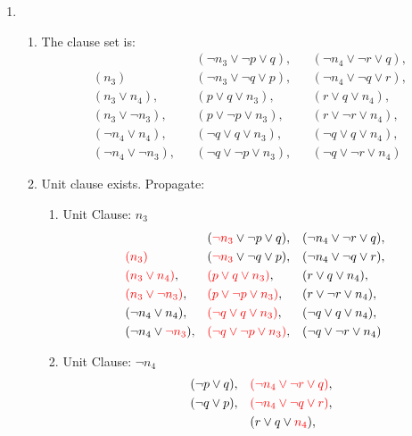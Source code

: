 \documentclass[11pt,a4paper]{article}
\begin{document}
\begin{enumerate}
\item 
\begin{enumerate}
\item The clause set is:
\begin{align*}
& & & (\neg n_3 \lor \neg p \lor q), & & (\neg n_4 \lor \neg r \lor q),\\ 
& (n_3) & & (\neg n_3 \lor \neg q \lor p),  && (\neg n_4 \lor \neg q \lor r), \\
&(n_3 \lor n_4),& & (p\lor q \lor n_3),  && (r \lor q \lor n_4), \\
&(n_3 \lor \neg  n_3 ) ,  & & (p \lor \neg p \lor n_3), & & (r \lor \neg r \lor n_4), \\
&(\neg n_4 \lor  n_4 ) , & & (\neg q \lor q \lor n_3),& & (\neg q \lor q \lor n_4), \\
&(\neg n_4 \lor  \neg  n_3), && (\neg q \lor \neg p \lor n_3), & & (\neg q \lor \neg r \lor n_4)
\end{align*}
\item Unit clause exists. Propagate:
\begin{enumerate}
\item Unit Clause:  $n_3$
\begin{align*}
& & & (\textcolor{red}{\neg n_3} \lor \neg p \lor q), & & (\neg n_4 \lor \neg r \lor q),\\ 
& \textcolor{red}{(n_3)} & & (\textcolor{red}{\neg n_3} \lor \neg q \lor p),  && (\neg n_4 \lor \neg q \lor r), \\
&\textcolor{red}{(n_3 \lor n_4)},& & \textcolor{red}{(p\lor q \lor n_3)},  && (r \lor q \lor n_4), \\
&\textcolor{red}{(n_3 \lor \neg  n_3 )} ,  & & \textcolor{red}{(p \lor \neg p \lor n_3)}, & & (r \lor \neg r \lor n_4), \\
&(\neg n_4 \lor  n_4 ) , & &\textcolor{red}{(\neg q \lor q \lor n_3)},& & (\neg q \lor q \lor n_4), \\
&(\neg n_4 \lor  \textcolor{red}{\neg  n_3}), && \textcolor{red}{(\neg q \lor \neg p \lor n_3)}, & & (\neg q \lor \neg r \lor n_4)
\end{align*}
\item Unit Clause:  $\neg n_4$
\begin{align*}
& & & ( \neg p \lor q), & & \textcolor{red}{(\neg n_4 \lor \neg r \lor q)},\\ 
& & & (\neg q \lor p),  && \textcolor{red}{(\neg n_4 \lor \neg q \lor r)}, \\
& & &  && (r \lor q \lor \textcolor{red}{n_4}), \\

\end{align*}
\end{enumerate}
\end{enumerate}
\end{enumerate}
\end{document}
